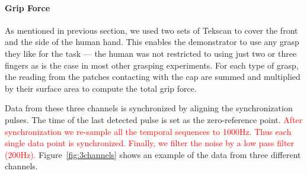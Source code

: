 \paragraph{\textbf{Grip Force}}
\label{tekscan}
As mentioned in previous section, we used two sets of Tekscan to cover
the front and the side of the human hand. This enables the
demonstrator to use any grasp they like for the task --- the human was
not restricted to using just two or three fingers as is the case in
most other grasping experiments. For each type of grasp, the reading
from the patches contacting with the cap are summed and multiplied by
their surface area to compute the total grip force. %


Data from these three channels is synchronized by aligning the
synchronization pulses. The time of the last detected pulse is set as
the zero-reference point. \textcolor{red}{After synchronization we re-sample all the
temporal sequences to 1000Hz. Thus each single data point is
synchronized. Finally, we filter the noise by a low pass
filter (200Hz).} Figure~\ref{fig:3channels} shows an example of the data from
three different channels.



